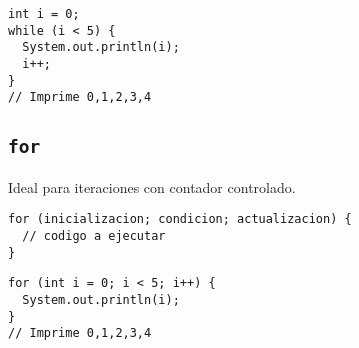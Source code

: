 \documentclass[12pt]{article}
\theoremstyle{largebreak}
\begin{document}
    \begin{exa}
        \begin{lstlisting}[caption={Uso de \lstinline|while|.},label=DescriptiveLabel]
int i = 0;
while (i < 5) {
  System.out.println(i);
  i++;
}
// Imprime 0,1,2,3,4
        \end{lstlisting}
    \end{exa}

    \subsection{\lstinline|for|}

    Ideal para iteraciones con contador controlado.

    \begin{lstlisting}[caption={Sintaxis de \lstinline|for|.},label=DescriptiveLabel]
for (inicializacion; condicion; actualizacion) {
  // codigo a ejecutar
}
    \end{lstlisting}

    \begin{exa}
        \begin{lstlisting}[caption={Uso de \lstinline|for|.},label=DescriptiveLabel]
for (int i = 0; i < 5; i++) {
  System.out.println(i);
}
// Imprime 0,1,2,3,4
        \end{lstlisting}
    \end{exa}
\end{document}
